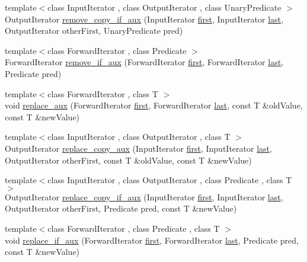 \begin{DoxyCompactItemize}
\item 
{\footnotesize template$<$class Input\+Iterator , class Output\+Iterator , class Unary\+Predicate $>$ }\\Output\+Iterator \hyperlink{namespaceprism_a198b599ea535deb9fdf28c46c8658bd4}{remove\+\_\+copy\+\_\+if\+\_\+aux} (Input\+Iterator \hyperlink{namespaceprism_ae3fb7a1926a9e8e59300cd5e370470da}{first}, Input\+Iterator \hyperlink{namespaceprism_abe4956c4e865f55ca126b7fb973b5078}{last}, Output\+Iterator other\+First, Unary\+Predicate pred)
\item 
{\footnotesize template$<$class Forward\+Iterator , class Predicate $>$ }\\Forward\+Iterator \hyperlink{namespaceprism_a95e9f5186670e27472aa7d8cd02397eb}{remove\+\_\+if\+\_\+aux} (Forward\+Iterator \hyperlink{namespaceprism_ae3fb7a1926a9e8e59300cd5e370470da}{first}, Forward\+Iterator \hyperlink{namespaceprism_abe4956c4e865f55ca126b7fb973b5078}{last}, Predicate pred)
\item 
{\footnotesize template$<$class Forward\+Iterator , class T $>$ }\\void \hyperlink{namespaceprism_ad053e45daef65797bc1cff18dfcd8dc0}{replace\+\_\+aux} (Forward\+Iterator \hyperlink{namespaceprism_ae3fb7a1926a9e8e59300cd5e370470da}{first}, Forward\+Iterator \hyperlink{namespaceprism_abe4956c4e865f55ca126b7fb973b5078}{last}, const T \&old\+Value, const T \&new\+Value)
\item 
{\footnotesize template$<$class Input\+Iterator , class Output\+Iterator , class T $>$ }\\Output\+Iterator \hyperlink{namespaceprism_a7055d91bb6279fa78b8b498297a11eab}{replace\+\_\+copy\+\_\+aux} (Input\+Iterator \hyperlink{namespaceprism_ae3fb7a1926a9e8e59300cd5e370470da}{first}, Input\+Iterator \hyperlink{namespaceprism_abe4956c4e865f55ca126b7fb973b5078}{last}, Output\+Iterator other\+First, const T \&old\+Value, const T \&new\+Value)
\item 
{\footnotesize template$<$class Input\+Iterator , class Output\+Iterator , class Predicate , class T $>$ }\\Output\+Iterator \hyperlink{namespaceprism_a1e660997b10ccb0985b35999c84a9bbf}{replace\+\_\+copy\+\_\+if\+\_\+aux} (Input\+Iterator \hyperlink{namespaceprism_ae3fb7a1926a9e8e59300cd5e370470da}{first}, Input\+Iterator \hyperlink{namespaceprism_abe4956c4e865f55ca126b7fb973b5078}{last}, Output\+Iterator other\+First, Predicate pred, const T \&new\+Value)
\item 
{\footnotesize template$<$class Forward\+Iterator , class Predicate , class T $>$ }\\void \hyperlink{namespaceprism_ad23d44d30470aed0ee16e931514bd727}{replace\+\_\+if\+\_\+aux} (Forward\+Iterator \hyperlink{namespaceprism_ae3fb7a1926a9e8e59300cd5e370470da}{first}, Forward\+Iterator \hyperlink{namespaceprism_abe4956c4e865f55ca126b7fb973b5078}{last}, Predicate pred, const T \&new\+Value)

\end{DoxyCompactItemize}
